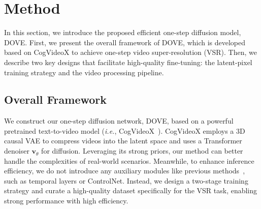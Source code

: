 \documentclass{article}
\newcommand\ie{\textit{i.e.}}
\begin{document}
\section{Method}
\vspace{-1.mm}
In this section, we introduce the proposed efficient one-step diffusion model, DOVE. First, we present the overall framework of DOVE, which is developed based on CogVideoX to achieve one-step video super-resolution (VSR).
Then, we describe two key designs that facilitate high-quality fine-tuning: the latent-pixel training strategy and the video processing pipeline.

\subsection{Overall Framework}
\vspace{-2.mm}
\label{sec:framework}
We construct our one-step diffusion network, DOVE, based on a powerful pretrained text-to-video model (\ie, CogVideoX~\cite{yang2024cogvideox}). 
CogVideoX employs a 3D causal VAE to compress videos into the latent space and uses a Transformer denoiser $\mathbf{v}_\theta$ for diffusion. 
Leveraging its strong priors, our method can better handle the complexities of real-world scenarios. Meanwhile, to enhance inference efficiency, we do not introduce any auxiliary modules like previous methods~\cite{yang2024motion,zhou2024upscale,he2024venhancer}, such as temporal layers or ControlNet. Instead, we design a two-stage training strategy and curate a high-quality dataset specifically for the VSR task, enabling strong performance with high efficiency.
\end{document}
